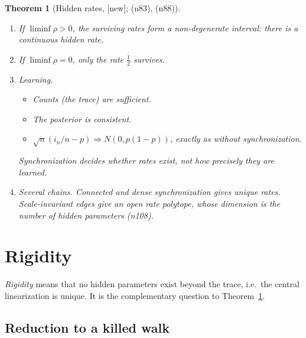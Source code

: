 \documentclass[11pt]{article}
\newtheorem{theorem}{Theorem}[section]
\theoremstyle{definition}
\theoremstyle{remark}
\newcommand{\status}[1]{\textsf{[#1]}}
\newcommand{\note}[1]{\textsf{(n#1)}}
\begin{document}
\begin{theorem}[Hidden rates, \status{new}; \note{83}, \note{88}]\label{thm:rates}
\leavevmode
\begin{enumerate}
\item If $\liminf\rho>0$, the surviving rates form a non-degenerate interval: there is a continuous hidden rate.
\item If $\liminf\rho=0$, only the rate $\tfrac12$ survives.
\item \emph{Learning.}
  \begin{itemize}
  \item Counts (the trace) are sufficient.
  \item The posterior is consistent.
  \item $\sqrt n(i_n/n-p)\Rightarrow N(0,p(1-p))$, exactly as without synchronization.
  \end{itemize}
  Synchronization decides whether rates exist, not how precisely they are learned.
\item \emph{Several chains.} Connected and dense synchronization gives unique rates. Scale-invariant edges give an open rate polytope, whose dimension is the number of hidden parameters \note{108}.
\end{enumerate}
\end{theorem}

\section{Rigidity}\label{sec:rigidity}

\emph{Rigidity} means that no hidden parameters exist beyond the trace, i.e.\ the central linearization is unique. It is the complementary question to Theorem~\ref{thm:rates}.

\subsection{Reduction to a killed walk}
\end{document}
